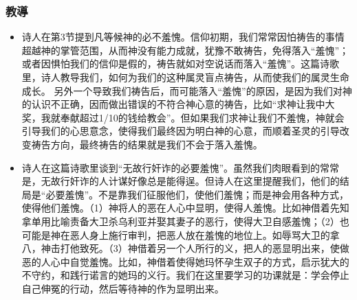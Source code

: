 \subsubsection{教導}
\begin{itemize}
\itemsep-.45em  
\item 诗人在第3节提到凡等候神的必不羞愧。信仰初期，我们常常因怕祷告的事情超越神的掌管范围，从而神没有能力成就，犹豫不敢祷告，免得落入“羞愧”；或者因惧怕我们的信仰是假的，祷告就如对空说话而落入“羞愧”。这篇诗歌里，诗人教导我们，如何为我们的这种属灵盲点祷告，从而使我们的属灵生命成长。
另外一个导致我们祷告后，而可能落入“羞愧”的原因，是因为我们对神的认识不正确，因而做出错误的不符合神心意的祷告，比如“求神让我中大奖，我就奉献超过1/10的钱给教会”。但如果我们求神让我们不羞愧，神就会引导我们的心思意念，使得我们最终因为明白神的心意，而顺着圣灵的引导改变祷告方向，最终祷告的结果就是我们不会于落入羞愧。
\item 诗人在这篇诗歌里谈到“无故行奸诈的必要羞愧”。虽然我们肉眼看到的常常是，无故行奸诈的人计谋好像总是能得逞。但诗人在这里提醒我们，他们的结局是“必要羞愧”。不是靠我们征服他们，使他们羞愧；而是神会用各种方式，使得他们羞愧。（1）神将人的恶在人心中显明，使得人羞愧。比如神借着先知拿单用比喻责备大卫杀乌利亚并娶其妻子的恶行，使得大卫自感羞愧；（2）也可能是神在恶人身上施行审判，把恶人放在羞愧的地位上。如辱骂大卫的拿八，神击打他致死。（3）神借着另一个人所行的义，把人的恶显明出来，使做恶的人心中自觉羞愧。比如，神借着使得她玛怀孕生双子的方式，启示犹大的不守约，和践行诺言的她玛的义行。我们在这里要学习的功课就是：学会停止自己伸冤的行动，然后等待神的作为显明出来。
\end{itemize}


